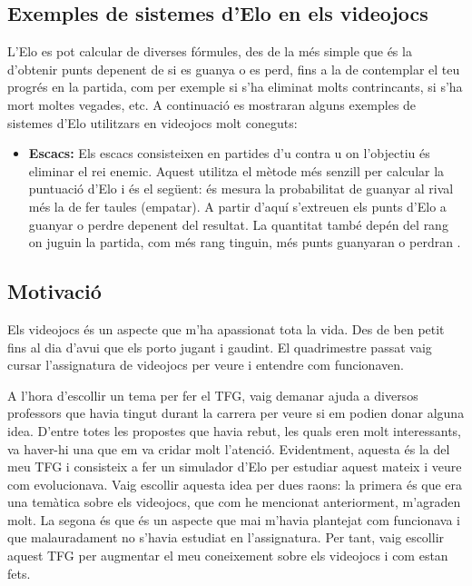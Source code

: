 \documentclass[a4paper]{article}
\begin{document}
\newpage
\subsection{Exemples de sistemes d'Elo en els videojocs}
L'Elo es pot calcular de diverses fórmules, des de la més simple que és la d'obtenir punts depenent de si es guanya o es perd, fins a la de contemplar el teu progrés en la partida, com per exemple si s'ha eliminat molts contrincants, si s'ha mort moltes vegades, etc. A continuació es mostraran alguns exemples de sistemes d'Elo utilitzars en videojocs molt coneguts:

\begin{itemize}
    \item \textbf{Escacs:} Els escacs consisteixen en partides d'u contra u on l'objectiu és eliminar el rei enemic. Aquest utilitza el mètode més senzill per calcular la puntuació d'Elo i és el següent: és mesura la probabilitat de guanyar al rival més la de fer taules (empatar). A partir d'aquí s'extreuen els punts d'Elo a guanyar o perdre depenent del resultat. La quantitat també depén del rang on juguin la partida, com més rang tinguin, més punts guanyaran o perdran \cite{wikipediaElo}.
    
\end{itemize}

\newpage
\subsection{Motivació}
Els videojocs és un aspecte que m'ha apassionat tota la vida. Des de ben petit fins al dia d'avui que els porto jugant i gaudint. El quadrimestre passat vaig cursar l'assignatura de videojocs per veure i entendre com funcionaven.

A l'hora d'escollir un tema per fer el TFG, vaig demanar ajuda a diversos professors que havia tingut durant la carrera per veure si em podien donar alguna idea. D'entre totes les propostes que havia rebut, les quals eren molt interessants, va haver-hi una que em va cridar molt l'atenció. Evidentment, aquesta és la del meu TFG i consisteix a fer un simulador d'Elo per estudiar aquest mateix i veure com evolucionava. Vaig escollir aquesta idea per dues raons: la primera és que era una temàtica sobre els videojocs, que com he mencionat anteriorment, m'agraden molt. La segona és que és un aspecte que mai m'havia plantejat com funcionava i que malauradament no s'havia estudiat en l'assignatura. Per tant, vaig escollir aquest TFG per augmentar el meu coneixement sobre els videojocs i com estan fets.
\end{document}
